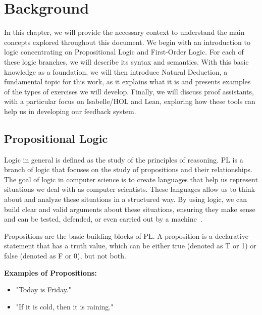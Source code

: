 
%

\chapter{Background}
In this chapter, we will provide the necessary context to understand the main concepts explored throughout this document. We begin with an introduction to logic concentrating on Propositional Logic and First-Order Logic. For each of these logic branches, we will describe its syntax and semantics. With this basic knowledge as a foundation, we will then introduce Natural Deduction, a fundamental topic for this work, as it explains what it is and presents examples of the types of exercises we will develop. Finally, we will discuss proof assistants, with a particular focus on Isabelle/HOL and Lean, exploring how these tools can help us in developing our feedback system.

\section{Propositional Logic}
\label{chap:prop}
Logic in general is defined as the study of the principles of reasoning. \gls{PL} is a branch of logic that focuses on the study of propositions and their relationships. The goal of logic in computer science is to create languages that help us represent situations we deal with as computer scientists. These languages allow us to think about and analyze these situations in a structured way. By using logic, we can build clear and valid arguments about these situations, ensuring they make sense and can be tested, defended, or even carried out by a machine~\cite{huth_2004_logic}.

Propositions are the basic building blocks of \gls{PL}. A proposition is a declarative statement that has a truth value, which can be either true (denoted as T or 1) or false (denoted as F or 0), but not both.

\textbf{Examples of Propositions:}
\begin{itemize}
    \item "Today is Friday."
    \item "If it is cold, then it is raining."
\end{itemize}

